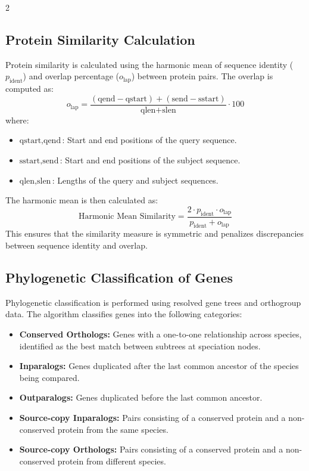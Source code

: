 2\documentclass{article}
\begin{document}
\subsection{Protein Similarity Calculation}
Protein similarity is calculated using the harmonic mean of sequence identity (\(p_{\text{ident}}\)) and overlap percentage (\(o_{\text{lap}}\)) between protein pairs. The overlap is computed as:
\[
o_{\text{lap}} = \frac{(\text{qend} - \text{qstart}) + (\text{send} - \text{sstart})}{\text{qlen} + \text{slen}} \cdot 100
\]
where:
\begin{itemize}
    \item \(\text{qstart}, \text{qend}\): Start and end positions of the query sequence.
    \item \(\text{sstart}, \text{send}\): Start and end positions of the subject sequence.
    \item \(\text{qlen}, \text{slen}\): Lengths of the query and subject sequences.
\end{itemize}

The harmonic mean is then calculated as:
\[
\text{Harmonic Mean Similarity} = \frac{2 \cdot p_{\text{ident}} \cdot o_{\text{lap}}}{p_{\text{ident}} + o_{\text{lap}}}
\]
This ensures that the similarity measure is symmetric and penalizes discrepancies between sequence identity and overlap.

\subsection{Phylogenetic Classification of Genes}
Phylogenetic classification is performed using resolved gene trees and orthogroup data. The algorithm classifies genes into the following categories:
\begin{itemize}
    \item \textbf{Conserved Orthologs:} Genes with a one-to-one relationship across species, identified as the best match between subtrees at speciation nodes.
    \item \textbf{Inparalogs:} Genes duplicated after the last common ancestor of the species being compared.
    \item \textbf{Outparalogs:} Genes duplicated before the last common ancestor.
    \item \textbf{Source-copy Inparalogs:} Pairs consisting of a conserved protein and a non-conserved protein from the same species.
    \item \textbf{Source-copy Orthologs:} Pairs consisting of a conserved protein and a non-conserved protein from different species.
\end{itemize}
\end{document}
